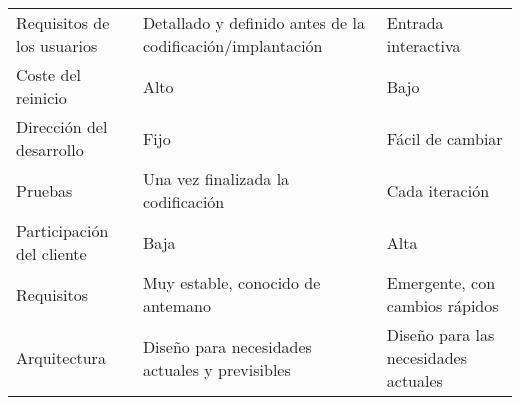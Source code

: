\begin{longtable}{|p{5cm}|p{5cm}|p{5cm}|}
    Requisitos de los usuarios                     & Detallado y definido antes de la codificación/implantación                                                                         & Entrada interactiva                                                                                                                                                                                 \\
    Coste del reinicio                             & Alto                                                                                                                               & Bajo                                                                                                                                                                                                \\
    Dirección del desarrollo                       & Fijo                                                                                                                               & Fácil de cambiar                                                                                                                                                                                    \\
    Pruebas                                        & Una vez finalizada la codificación                                                                                                 & Cada iteración                                                                                                                                                                                      \\
    Participación del cliente                      & Baja                                                                                                                               & Alta                                                                                                                                                                                                \\
    Requisitos                                     & Muy estable, conocido de antemano                                                                                                  & Emergente, con cambios rápidos                                                                                                                                                                      \\
    Arquitectura                                   & Diseño para necesidades actuales y previsibles                                                                                     & Diseño para las necesidades actuales                                                                                                                                                                \\

\end{longtable}
